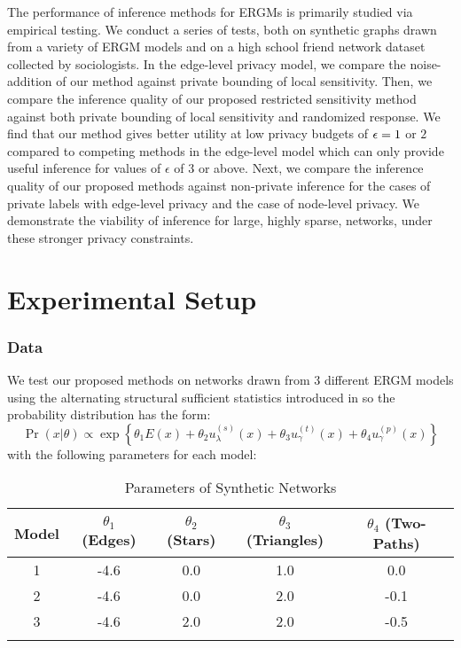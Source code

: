  The performance of inference methods for ERGMs is primarily studied via empirical testing. We conduct a series of tests, both on synthetic graphs drawn from a variety of ERGM models and on a high school friend network dataset collected by sociologists. In the edge-level privacy model, we compare the noise-addition of our method against private bounding of local sensitivity. Then, we compare the inference quality of our proposed restricted sensitivity method against both private bounding of local sensitivity and randomized response. We find that our method gives better utility at low privacy budgets of $\epsilon =1$ or $2$ compared to competing methods in the edge-level model which can only provide useful inference for values of $\epsilon$ of $3$ or above. Next, we compare the inference quality of our proposed methods against non-private inference for the cases of private labels with edge-level privacy and the case of node-level privacy. We demonstrate the viability of inference for large, highly sparse, networks, under these stronger privacy constraints.
 
 \section{Experimental Setup}
 
 \subsubsection*{Data}
 	We test our proposed methods on networks drawn from $3$ different ERGM models using the alternating structural sufficient statistics introduced in  so the probability distribution has the form:
 	$$\Pr(x | \theta) \propto \exp\left\{\theta_1 E(x) + \theta_2 u_\lambda^{(s)}(x) + \theta_3 u_\gamma^{(t)}(x)  + \theta_4 u_\gamma^{(p)}(x)\right\} $$
 	 with the following parameters for each model:
 	\begin{table}[!ht]
 		\centering
 		\begin{tabular}{|c|c|c|c|c|}
 			\hhline{|=====|}
 			Model & $\theta_1$ (Edges) & $\theta_2$ (Stars) & $\theta_3$ (Triangles) & $\theta_4$ (Two-Paths) \\ \hline
			1 & -4.6 & 0.0 & 1.0 & 0.0  \\
			2 & -4.6 & 0.0 & 2.0 & -0.1 \\
			3 & -4.6 & 2.0 & 2.0 & -0.5 \\
			\hhline{|=====|}
 		\end{tabular}
 	\caption{Parameters of Synthetic Networks}
 	\label{table:ergm_params}
 	\end{table}
 
